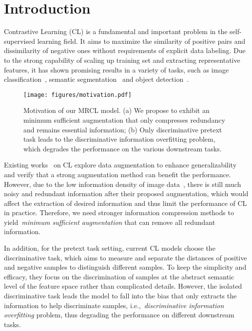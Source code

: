 \documentclass[10pt,twocolumn,letterpaper]{article}
\begin{document}
\section{Introduction}
\label{sec:intro}

Contrastive Learning (CL) is a fundamental and important problem in the self-supervised learning field. It aims to maximize the similarity of positive pairs and dissimilarity of negative ones without requirements of explicit data labeling. Due to the strong capability of scaling up training set and extracting representative features, it has shown promising results in a variety of tasks, such as image classification~\cite{yang2022unified,he2020momentum}, semantic segmentation~\cite{wang2021exploring,zhao2021contrastive} and object detection~\cite{xie2021detco,yang2021instance}. 
\begin{figure}[t!]
    \centering
    \texttt{[image: figures/motivation.pdf]}
    \caption{Motivation of our MRCL model. (a) We propose to exhibit an minimum sufficient augmentation that only compresses redundancy and remains essential information; (b) Only discriminative pretext task leads to the discriminative information overfitting problem, which degrades the performance on the various downstream tasks.}
    \label{fig:motivation}
\end{figure}



Existing works~\cite{chen2020simple,bachman2019learning,tian2020makes} on CL explore data augmentation to enhance generalizability and verify that a strong augmentation method can benefit the performance. However, due to the low information density of image data~\cite{he2022masked,xie2022simmim}, there is still much noisy and redundant information after their proposed augmentation, which would affect the extraction of desired information and thus limit the performance of CL in practice. Therefore, we need stronger information compression methods to yield~\textit{minimum sufficient augmentation} that can remove all redundant information.

In addition, for the pretext task setting, current CL models choose the discriminative task, which aims to measure and separate the distances of positive and negative samples to distinguish different samples. To keep the simplicity and efficacy, they focus on the discrimination of samples at the abstract semantic level of the feature space rather than complicated details.
However, the isolated discriminative task leads the model to fall into the bias that only extracts the information to help discriminate samples, i.e.,~\textit{discriminative information overfitting} problem, thus degrading the performance on different downstream tasks. 
\end{document}
